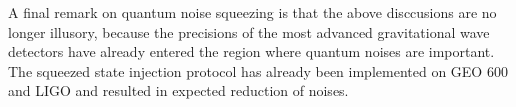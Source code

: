 \documentclass[hyperref, a4paper]{article}
\begin{document}
A final remark on quantum noise squeezing is that 
the above disccusions are no longer illusory,
because the precisions of the most advanced gravitational wave detectors 
have already entered the region where quantum noises are important.
The squeezed state injection protocol has already been implemented on GEO 600 and LIGO 
\cite{abadie_gravitational_2011,aasi_enhanced_2013}
and resulted in expected reduction of noises.

\printbibliography
\end{document}
